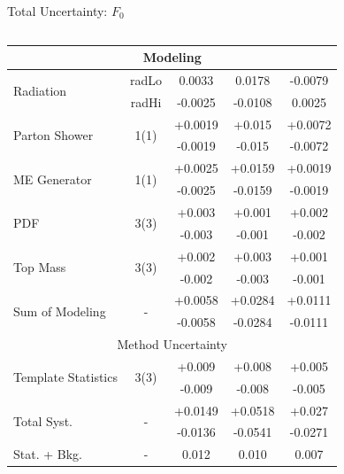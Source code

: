\documentclass{beamer}
\newcommand*{\fo}{\ensuremath{F_{\text{0}}}\xspace}
\begin{document}
{\begin{frame}{Total Uncertainty: \fo}
\begin{columns}
\begin{table}[h!]
\begin{tabular}{lcccc}
          \hline
          \multicolumn{5}{c}{Modeling} \\\hline
          \multirow{2}{*}{Radiation} & radLo & 0.0033 & 0.0178 & -0.0079\\
                                 & radHi & -0.0025 & -0.0108 & 0.0025\\ \hline
          \multirow{2}{*}{Parton Shower} & \multirow{2}{*}{1(1)} & +0.0019 & +0.015 & +0.0072\\
                                 &                       & -0.0019 & -0.015 & -0.0072\\\hline
          \multirow{2}{*}{ME Generator} & \multirow{2}{*}{1(1)} & +0.0025 & +0.0159 & +0.0019\\
                                 &                       & -0.0025 & -0.0159 & -0.0019\\\hline
          \multirow{2}{*}{PDF} & \multirow{2}{*}{3(3)} & +0.003 & +0.001 & +0.002\\
                                 &                       & -0.003 & -0.001 & -0.002\\\hline
          \multirow{2}{*}{Top Mass} & \multirow{2}{*}{3(3)} & +0.002 & +0.003 & +0.001\\
                                 &                       & -0.002 & -0.003 & -0.001\\\hline
          
          \hline\hline
          \multirow{2}{*}{Sum of Modeling} & \multirow{2}{*}{-} & +0.0058 & +0.0284 & +0.0111\\
                                 &                       & -0.0058 & -0.0284 & -0.0111\\\hline
          
          \hline
          \multicolumn{5}{c}{Method Uncertainty} \\\hline
          \multirow{2}{*}{Template Statistics} & \multirow{2}{*}{3(3)} & +0.009 & +0.008 & +0.005\\
                                 &                       & -0.009 & -0.008 & -0.005\\\hline
          
          \hline\hline
          \multirow{2}{*}{Total Syst.} & \multirow{2}{*}{-} & +0.0149 & +0.0518 & +0.027\\
                                 &                       & -0.0136 & -0.0541 & -0.0271\\\hline
          Stat. + Bkg. & - & 0.012 & 0.010 & 0.007 \\\hline
          

\end{tabular}
\end{table}
\end{columns}
\end{frame}}
\end{document}
